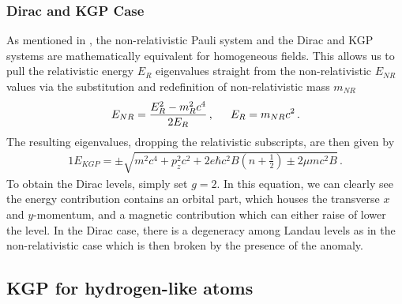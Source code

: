 \subsubsection*{Dirac and KGP Case}\label{ajsss:DKGP}
\noindent As mentioned in , the non-relativistic Pauli system and the Dirac and KGP systems are mathematically equivalent for homogeneous fields. This allows us to pull the relativistic energy $E_{R}$ eigenvalues straight from the non-relativistic $E_{NR}$ values via the substitution and redefinition of non-relativistic mass $m_{NR}$
\begin{alignat}{1}
	\label{eq:DKGP:01} E_{NR} = \frac{E_{R}^{2}-m_{R}^{2}c^{4}}{2E_{R}}\,,\indent  E_{R} = m_{NR}c^{2}\,.
\end{alignat}
The resulting eigenvalues, dropping the relativistic subscripts, are then given by
\begin{alignat}{1}
	\label{eq:DKGP:02} E_{KGP} =\pm\sqrt{m^{2}c^{4}+p_{z}^{2}c^{2}+2e\hbar c^{2}B\left(n+\frac{1}{2}\right)\pm2\mu mc^{2}B}\,.
\end{alignat}
To obtain the Dirac levels, simply set $g=2$. In this equation, we can clearly see the energy contribution contains an orbital part, which houses the transverse $x$ and $y$-momentum, and a magnetic contribution which can either raise of lower the level. In the Dirac case, there is a degeneracy among Landau levels as in the non-relativistic case which is then broken by the presence of the anomaly.

\subsection{KGP for hydrogen-like atoms}
